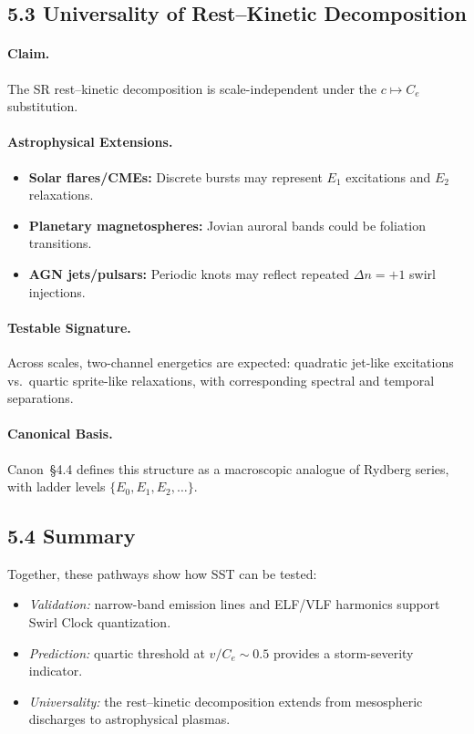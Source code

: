 \documentclass[11pt]{article}
\newcommand{\Ce}{C_{e}}
\begin{document}
\subsection*{5.3 Universality of Rest--Kinetic Decomposition}

\paragraph{Claim.}
    The SR rest--kinetic decomposition is scale-independent under the
    $c \mapsto \Ce$ substitution.

\paragraph{Astrophysical Extensions.}
    \begin{itemize}
    \item \textbf{Solar flares/CMEs:} Discrete bursts may represent
    $E_1$ excitations and $E_2$ relaxations.
    \item \textbf{Planetary magnetospheres:} Jovian auroral bands could
    be foliation transitions.
    \item \textbf{AGN jets/pulsars:} Periodic knots may reflect repeated
    $\Delta n=+1$ swirl injections.
    \end{itemize}

\paragraph{Testable Signature.}
    Across scales, two-channel energetics are expected:
    quadratic jet-like excitations vs.\ quartic sprite-like relaxations,
    with corresponding spectral and temporal separations.

\paragraph{Canonical Basis.}
    Canon~§4.4 defines this structure as a macroscopic analogue of
    Rydberg series, with ladder levels $\{E_0,E_1,E_2,\dots\}$.

\subsection*{5.4 Summary}

Together, these pathways show how SST can be tested:
\begin{itemize}
\item \emph{Validation:} narrow-band emission lines and ELF/VLF harmonics
support Swirl Clock quantization.
\item \emph{Prediction:} quartic threshold at $v/\Ce \sim 0.5$ provides a
storm-severity indicator.
\item \emph{Universality:} the rest--kinetic decomposition extends
from mesospheric discharges to astrophysical plasmas.
\end{itemize}
\end{document}
